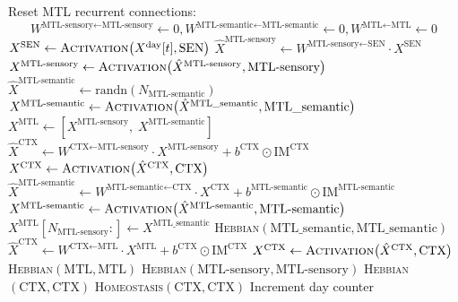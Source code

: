 \documentclass{article}
\begin{document}
\begin{algorithm}[h!]
\caption{Wake}\label{alg:wake}
\begin{algorithmic}[1]
        \State Reset MTL recurrent connections:
            \[
                W^{\textrm{MTL-sensory} \leftarrow \textrm{MTL-sensory}} \gets 0, W^{\textrm{MTL-semantic} \leftarrow \textrm{MTL-semantic}} \gets 0,
                W^{\textrm{MTL} \leftarrow \textrm{MTL}} \gets 0
            \]
        \State $X^{\textrm{SEN}} \gets \textsc{Activation}\bigl(X^{\textrm{day}}[t], \textrm{SEN}\bigr)$
        \State $\hat{X}^{\textrm{MTL-sensory}} 
            \gets 
            W^{\textrm{MTL-sensory} \leftarrow \textrm{SEN}} 
            \cdot X^{\textrm{SEN}}$
        \State $X^{\textrm{MTL-sensory}} 
            \gets 
            \textsc{Activation}\bigl(\hat{X}^{\textrm{MTL-sensory}}, \textrm{MTL-sensory}\bigr)$
        \State $\hat{X}^{\textrm{MTL-semantic}} 
            \gets 
            \text{randn}(N_\textrm{MTL-semantic})$
        \State $X^{\textrm{MTL-semantic}} 
            \gets 
            \textsc{Activation}\bigl(\hat{X}^{\textrm{MTL\_semantic}}, \textrm{MTL\_semantic}\bigr)$
        \State $X^{\textrm{MTL}} 
            \gets 
            [X^{\textrm{MTL-sensory}}, \; X^{\textrm{MTL-semantic}}]$
        \State $\hat{X}^{\textrm{CTX}} 
            \gets 
            W^{\textrm{CTX} \leftarrow \textrm{MTL-sensory}}\cdot X^{\textrm{MTL-sensory}}  + b^\textrm{CTX}\odot\textrm{IM}^\textrm{CTX}$
        \State $X^{\textrm{CTX}} 
            \gets 
            \textsc{Activation}\bigl(\hat{X}^{\textrm{CTX}}, \textrm{CTX}\bigr)$
            \State $\hat{X}^{\textrm{MTL-semantic}} 
                \gets 
                W^{\textrm{MTL-semantic} \leftarrow \textrm{CTX}}
                \cdot X^{\textrm{CTX}} +  b^\textrm{MTL-semantic}\odot\textrm{IM}^\textrm{MTL-semantic}$
            \State $X^{\textrm{MTL-semantic}} 
                \gets 
                \textsc{Activation}\bigl(\hat{X}^{\textrm{MTL-semantic}}, \textrm{MTL-semantic}\bigr)$
            \State $X^{\textrm{MTL}}[N_\textrm{MTL-sensory}:] 
                \gets 
                X^{\textrm{MTL\_semantic}}$
            \State \textsc{Hebbian}$(\textrm{MTL\_semantic}, \textrm{MTL\_semantic})$
        \EndIf
            \State $\hat{X}^{\textrm{CTX}} 
                \gets 
                W^{\textrm{CTX} \leftarrow \textrm{MTL}}\cdot X^{\textrm{MTL}} +  b^\textrm{CTX}\odot\textrm{IM}^\textrm{CTX}$
            \State $X^{\textrm{CTX}} 
                \gets 
                \textsc{Activation}\bigl(\hat{X}^{\textrm{CTX}}, \textrm{CTX}\bigr)$
        \EndIf
        \State \textsc{Hebbian}$(\textrm{MTL}, \textrm{MTL})$
        \State \textsc{Hebbian}$(\textrm{MTL-sensory}, \textrm{MTL-sensory})$
        \State \textsc{Hebbian}$(\textrm{CTX}, \textrm{CTX})$
        \State \textsc{Homeostasis}$(\textrm{CTX}, \textrm{CTX})$
    \EndFor
    \State Increment day counter
\EndFunction
\end{algorithmic}
\end{algorithm}
\end{document}
